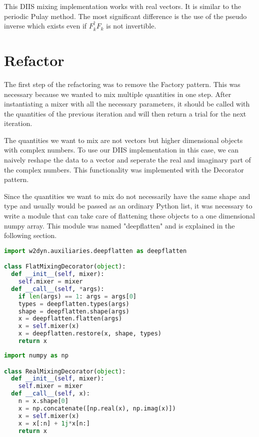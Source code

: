 This DIIS mixing implementation works with real vectors. It is similar to the periodic Pulay method\cite{diis_periodic}. The most significant difference is the use of the pseudo inverse which exists even if \(F_k^\dagger F_k\) is not invertible.

\section{Refactor}
The first step of the refactoring was to remove the Factory pattern. This was necessary because we wanted to mix multiple quantities in one step. After instantiating a mixer with all the necessary parameters, it should be called with the quantities of the previous iteration and will then return a trial for the next iteration.

The quantities we want to mix are not vectors but higher dimensional objects with complex numbers. To use our DIIS implementation in this case, we can naively reshape the data to a vector and seperate the real and imaginary part of the complex numbers. This functionality was implemented with the Decorator pattern.

Since the quantities we want to mix do not necessarily have the same shape and type and usually would be passed as an ordinary Python list, it was necessary to write a module that can take care of flattening these objects to a one dimensional numpy array. This module was named "deepflatten" and is explained in the following section.

\begin{lstlisting}[label=lst:flatdec, language=python, caption=Flat mixing decorator]
import w2dyn.auxiliaries.deepflatten as deepflatten

class FlatMixingDecorator(object):
  def __init__(self, mixer):
    self.mixer = mixer
  def __call__(self, *args):
    if len(args) == 1: args = args[0]
    types = deepflatten.types(args)
    shape = deepflatten.shape(args)
    x = deepflatten.flatten(args)
    x = self.mixer(x)
    x = deepflatten.restore(x, shape, types)
    return x
\end{lstlisting}

\begin{lstlisting}[label=lst:realdec, language=python, caption=Real mixing decorator]
import numpy as np

class RealMixingDecorator(object):
  def __init__(self, mixer):
    self.mixer = mixer
  def __call__(self, x):
    n = x.shape[0]
    x = np.concatenate([np.real(x), np.imag(x)])
    x = self.mixer(x)
    x = x[:n] + 1j*x[n:]
    return x
\end{lstlisting}

